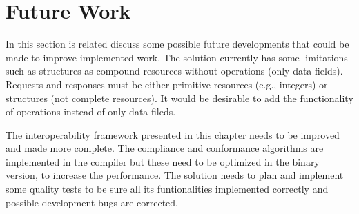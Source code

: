 \section{Future Work}
\label{section:future}
In this section is related discuss some possible future developments that could be made to improve implemented work.
The solution currently has some limitations such as structures as compound resources without operations (only data fields). Requests and responses must be either primitive resources (e.g., integers) or structures (not complete resources). It would be desirable to add the functionality of operations instead of only data fileds.

The interoperability framework presented in this chapter needs to be improved and made more complete. The compliance and conformance algorithms are implemented in the compiler but these need to be optimized in the binary version, to increase the performance. The solution needs to plan and implement some quality tests to be sure all its funtionalities implemented correctly and possible development bugs are corrected.
